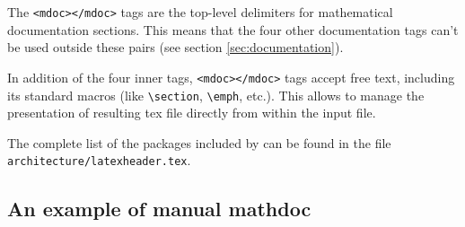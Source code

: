 The \lstinline!<mdoc></mdoc>! tags are the top-level delimiters for \faust mathematical documentation sections. This means that the four other documentation tags can't be used outside these pairs (see section \ref{sec:documentation}).

In addition of the four inner tags, \lstinline!<mdoc></mdoc>! tags accept free \latex text, including its standard macros (like \lstinline!\section!, \lstinline!\emph!, etc.). This allows to manage the presentation of resulting tex file directly from within the input \faust file. 

The complete list of the \latex packages included by \faust can be found in the file \lstinline!architecture/latexheader.tex!.

\subsection{An example of manual mathdoc}
\label{sec:ex-mathdoc}

